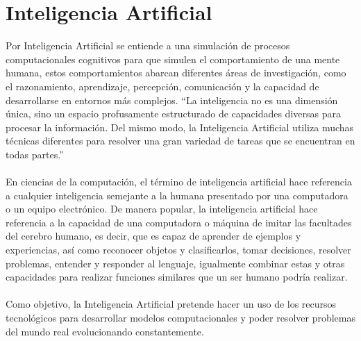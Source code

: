 \documentclass[12pt, a4paper, titlepage]{report}
\begin{document}
		\section{Inteligencia Artificial}
		Por Inteligencia Artificial se entiende a una simulación de procesos computacionales cognitivos para que simulen el comportamiento de una mente humana, estos comportamientos abarcan diferentes áreas de investigación, como el razonamiento, aprendizaje, percepción, comunicación y la capacidad de desarrollarse en entornos más complejos.
		“La inteligencia no es una dimensión única, sino un espacio profusamente estructurado de capacidades diversas para procesar la información. Del mismo modo, la Inteligencia Artificial utiliza muchas técnicas diferentes para resolver una gran variedad de tareas que se encuentran en todas partes.” \cite{Inteligencia_Artificial}\\\\
		En ciencias de la computación, el término de inteligencia artificial hace referencia a cualquier inteligencia semejante a la humana presentado por una computadora o un equipo electrónico. De manera popular, la inteligencia artificial hace referencia a la capacidad de una computadora o máquina de imitar las facultades del cerebro humano, es decir, que es capaz de aprender de ejemplos y experiencias, así como reconocer objetos y clasificarlos, tomar decisiones, resolver problemas, entender y responder al lenguaje, igualmente combinar estas y otras capacidades para realizar funciones similares que un ser humano podría realizar. \cite{refInteligencia_Artificial2}\\\\
		Como objetivo, la Inteligencia Artificial pretende hacer un uso de los recursos tecnológicos para desarrollar modelos computacionales y poder resolver problemas del mundo real evolucionando constantemente.
\end{document}
